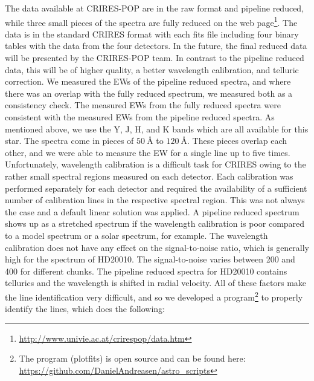 \documentclass{aa}
\begin{document}
The data available at CRIRES-POP are in the raw format and pipeline
reduced, while three small pieces of the spectra are fully reduced on the web
page\footnote{\url{http://www.univie.ac.at/crirespop/data.htm}}. The data
is in the standard CRIRES format with each fits file including four
binary tables with the data from the four detectors. In the future, the final
reduced data will be presented by the CRIRES-POP team. In contrast to the pipeline reduced data, this
will be of higher quality, a better wavelength calibration, and telluric correction. We
measured the EWs of the pipeline reduced spectra, and where there was
an overlap with the fully reduced spectrum, we measured both as a
consistency check. The measured EWs from the fully reduced spectra were
consistent with the measured EWs from the pipeline reduced spectra. As
mentioned above, we use the Y, J, H, and K bands which are all available
for this star. The spectra come in pieces of $\SI{50}{\angstrom}$
to $\SI{120}{\angstrom}$. These pieces  overlap each
other, and we were able to measure the EW for a single line up to
five times. Unfortunately, wavelength calibration is a difficult task
for CRIRES owing to the rather small spectral regions measured on each
detector. Each calibration was performed separately for each detector
and required the availability of a sufficient number of calibration
lines in the respective spectral region. This was not always the case
and a default linear solution was applied. A pipeline reduced spectrum
shows up as a stretched spectrum if the wavelength calibration is poor
compared to  a model spectrum or a solar spectrum, for example. The wavelength
calibration does not have any effect on the signal-to-noise ratio, which
is generally high for the spectrum of HD20010. The signal-to-noise
varies between 200 and 400 for different chunks. The pipeline reduced
spectra for HD20010 contains tellurics and the wavelength is shifted in
radial velocity. All of these factors make the line identification very
difficult, and so we developed a program\footnote{The program
(plot\textunderscore{}fits) is open source and can be found here:
\url{https://github.com/DanielAndreasen/astro_scripts}} to properly
identify the lines, which  does the following:
\end{document}
